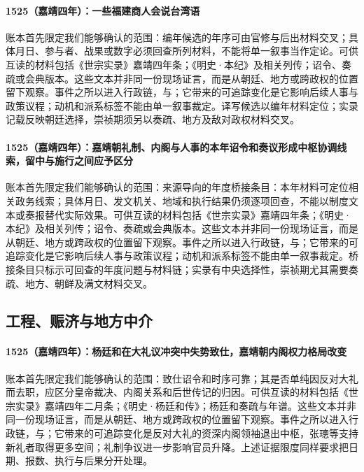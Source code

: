 \paragraph{1525（嘉靖四年）：一些福建商人会说台湾语} 账本首先限定我们能够确认的范围：编年候选的年序可由官修与后出材料交叉；具体月日、参与者、战果或数字必须回查所列材料，不能将单一叙事当作定论。可供互读的材料包括《世宗实录》嘉靖四年条；《明史·本纪》及相关列传；诏令、奏疏或会典版本。这些文本并非同一份现场证言，而是从朝廷、地方或跨政权的位置留下观察。事件之所以进入行政链，与；它带来的可追踪变化是它影响后续人事与政策议程；动机和派系标签不能由单一叙事裁定。译写候选以编年材料定位；实录记载反映朝廷选择，崇祯期须另以奏疏、地方及敌对政权材料交叉。

\paragraph{1525（嘉靖四年）：嘉靖朝礼制、内阁与人事的本年诏令和奏议形成中枢协调线索，留中与施行之间应予区分} 账本首先限定我们能够确认的范围：来源导向的年度桥接条目：本年材料可定位相关政务线索；具体月日、发文机关、地域和执行结果仍须逐项回查，不能以制度文本或奏报替代实际效果。可供互读的材料包括《世宗实录》嘉靖四年条；《明史·本纪》及相关列传；诏令、奏疏或会典版本。这些文本并非同一份现场证言，而是从朝廷、地方或跨政权的位置留下观察。事件之所以进入行政链，与；它带来的可追踪变化是它影响后续人事与政策议程；动机和派系标签不能由单一叙事裁定。桥接条目只标示可回查的年度问题与材料链；实录有中央选择性，崇祯期尤其需要奏疏、地方、朝鲜及满文材料交叉。

\subsection{工程、赈济与地方中介}

\paragraph{1525（嘉靖四年）：杨廷和在大礼议冲突中失势致仕，嘉靖朝内阁权力格局改变} 账本首先限定我们能够确认的范围：致仕诏令和时序可靠；其是否单纯因反对大礼而去职，应区分皇帝裁决、内阁关系和后世传记的归因。可供互读的材料包括《世宗实录》嘉靖四年二月条；《明史·杨廷和传》；杨廷和奏疏与年谱。这些文本并非同一份现场证言，而是从朝廷、地方或跨政权的位置留下观察。事件之所以进入行政链，与；它带来的可追踪变化是反对大礼的资深内阁领袖退出中枢，张璁等支持新礼者取得更多空间；礼制争议进一步影响官员升降。上述证据限度同样要求把日期、报数、执行与后果分开处理。

